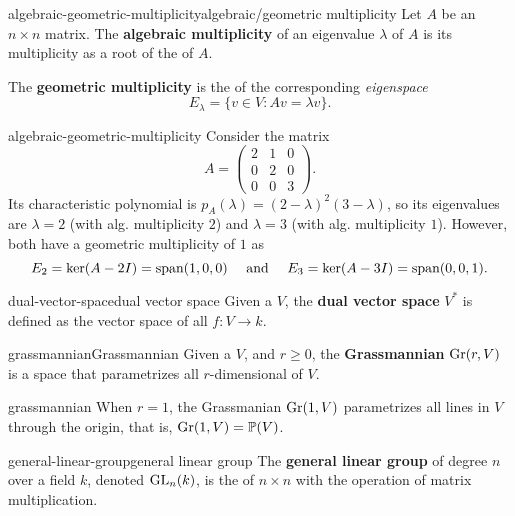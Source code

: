 \begin{topic}{algebraic-geometric-multiplicity}{algebraic/geometric multiplicity}
    Let $A$ be an $n \times n$ matrix. The \textbf{algebraic multiplicity} of an eigenvalue $\lambda$ of $A$ is its multiplicity as a root of the  of $A$.
    
    The \textbf{geometric multiplicity} is the  of the corresponding \textit{eigenspace}
    \[ E_\lambda = \{ v \in V : A v = \lambda v \} . \]
\end{topic}

\begin{example}{algebraic-geometric-multiplicity}
    Consider the matrix
    \[ A = \begin{pmatrix} 2 & 1 & 0 \\ 0 & 2 & 0 \\ 0 & 0 & 3 \end{pmatrix} . \]
    Its characteristic polynomial is $p_A(\lambda) = (2 - \lambda)^2 (3 - \lambda)$, so its eigenvalues are $\lambda = 2$ (with alg. multiplicity $2$) and $\lambda = 3$ (with alg. multiplicity $1$). However, both have a geometric multiplicity of $1$ as
    \[ E_2 = \ker(A - 2I) = \textup{span}(1, 0, 0) \quad \textup{ and } \quad E_3 = \ker(A - 3I) = \textup{span}(0, 0, 1) . \]
\end{example}

\begin{topic}{dual-vector-space}{dual vector space}
    Given a  $V$, the \textbf{dual vector space} $V^*$ is defined as the vector space of all  $f : V \to k$.
\end{topic}

\begin{topic}{grassmannian}{Grassmannian}
    Given a  $V$, and $r \ge 0$, the \textbf{Grassmannian} $\textup{Gr}(r, V)$ is a space that parametrizes all $r$-dimensional  of $V$.
\end{topic}

\begin{example}{grassmannian}
    When $r = 1$, the Grassmanian $\textup{Gr}(1, V)$ parametrizes all lines in $V$ through the origin, that is, $\textup{Gr}(1, V) = \mathbb{P}(V)$.
\end{example}

\begin{topic}{general-linear-group}{general linear group}
    The \textbf{general linear group} of degree $n$ over a field $k$, denoted $\textup{GL}_n(k)$, is the  of $n \times n$  with the operation of matrix multiplication.
\end{topic}

